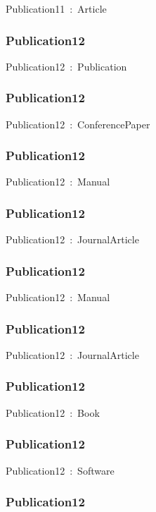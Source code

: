 \documentclass{article}
\begin{document}
Publication11~:~Article

\subsubsection*{Publication12}

Publication12~:~Publication

\subsubsection*{Publication12}

Publication12~:~ConferencePaper

\subsubsection*{Publication12}

Publication12~:~Manual

\subsubsection*{Publication12}

Publication12~:~JournalArticle

\subsubsection*{Publication12}

Publication12~:~Manual

\subsubsection*{Publication12}

Publication12~:~JournalArticle

\subsubsection*{Publication12}

Publication12~:~Book

\subsubsection*{Publication12}

Publication12~:~Software

\subsubsection*{Publication12}
\end{document}
